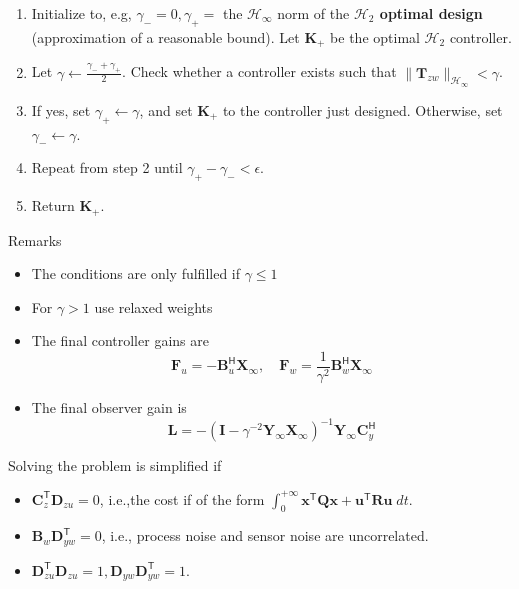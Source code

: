 \begin{enumerate}
    \item Initialize to, e.g, $\gamma_-=0,\gamma_+=$ the $\mathcal{H}_\infty$ norm of the \textbf{$\mathcal{H}_2$ optimal design} (approximation of a reasonable bound). Let $\mathbf{K}_+$ be the optimal $\mathcal{H}_2$ controller.
    \item Let $\gamma\gets \frac{\gamma_-+\gamma_+}{2}$. Check whether a controller exists such that $\|\mathbf{T}_{zw}\|_{\mathcal{H}_\infty}<\gamma$.
    \item If yes, set $\gamma_+\leftarrow\gamma$, and set $\mathbf{K}_+$ to the controller just designed. Otherwise, set $\gamma_-\leftarrow\gamma$.
    \item Repeat from step 2 until $\gamma_+-\gamma_-<\epsilon$.
    \item Return $\mathbf{K}_+$.
\end{enumerate}
\newpar{}
Remarks
\begin{itemize}
    \item The conditions are only fulfilled if $\gamma\le 1$
    \item For $\gamma>1$ use relaxed weights
    \item The final controller gains are
          \begin{equation*}
              \mathbf{F}_u=-\mathbf{B}_u^{\mathsf{H}}\mathbf{X}_\infty,\quad \mathbf{F}_w=\frac1{\gamma^2}\mathbf{B}_w^{\mathsf{H}}\mathbf{X}_\infty
          \end{equation*}
    \item The final observer gain is
          \begin{equation*}
              \mathbf{L}=-{(\mathbf{I}-\gamma^{-2}\mathbf{Y}_\infty \mathbf{X}_\infty)}^{-1}\mathbf{Y}_\infty \mathbf{C}_y^{\mathsf{H}}
          \end{equation*}
\end{itemize}

\newpar{}

Solving the problem is simplified if
\begin{itemize}
    \item $\mathbf{C}_{z}^{\mathsf{T}}\mathbf{D}_{zu}=0$, i.e.,the cost if of the form $\int_0^{+\infty}\mathbf{x}^{\mathsf{T}}\mathbf{Q}\mathbf{x}+\mathbf{u}^{\mathsf{T}}\mathbf{R}\mathbf{u}\;dt$.
    \item $\mathbf{B}_w \mathbf{D}_{yw}^{\mathsf{T}}=0$, i.e., process noise and sensor noise are uncorrelated.
    \item $\mathbf{D}_{zu}^{\mathsf{T}}\mathbf{D}_{zu}=1,\mathbf{D}_{yw}\mathbf{D}_{yw}^{\mathsf{T}}=1$.
\end{itemize}


